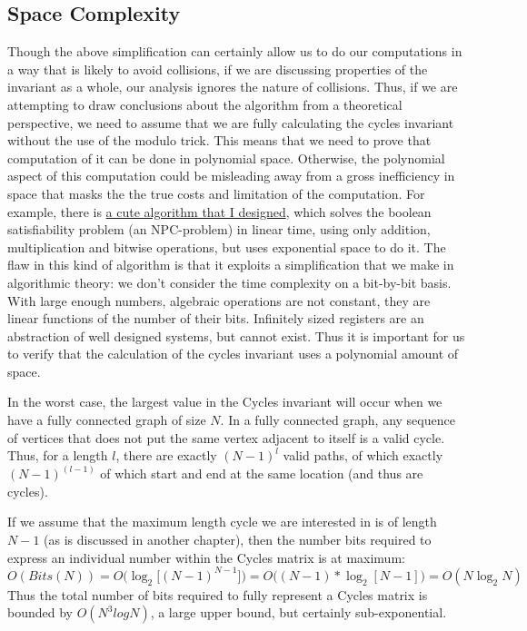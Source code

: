 \subsection{Space Complexity}
Though the above simplification can certainly allow us to do our computations in a way that is likely to avoid collisions, if we are discussing properties of the invariant as a whole, our analysis ignores the nature of collisions.
Thus, if we are attempting to draw conclusions about the algorithm from a theoretical perspective, we need to assume that we are fully calculating the cycles invariant without the use of the modulo trick.
This means that we need to prove that computation of it can be done in polynomial space.
Otherwise, the polynomial aspect of this computation could be misleading away from a gross inefficiency in space that masks the the true costs and limitation of the computation.
For example, there is \href{http://www.github.com/gbdubs/bytes}{a cute algorithm that I designed}, which solves the boolean satisfiability problem (an NPC-problem) in linear time, using only addition, multiplication and bitwise operations, but uses exponential space to do it. 
The flaw in this kind of algorithm is that it exploits a simplification that we make in algorithmic theory: we don't consider the time complexity on a bit-by-bit basis.
With large enough numbers, algebraic operations are not constant, they are linear functions of the number of their bits.
Infinitely sized registers are an abstraction of well designed systems, but cannot exist.
Thus it is important for us to verify that the calculation of the cycles invariant uses a polynomial amount of space.

In the worst case, the largest value in the Cycles invariant will occur when we have a fully connected graph of size $N$.
In a fully connected graph, any sequence of vertices that does not put the same vertex adjacent to itself is a valid cycle.
Thus, for a length $l$, there are exactly $(N-1)^l$ valid paths, of which exactly $(N-1)^{(l-1)}$ of which start and end at the same location (and thus are cycles).

If we assume that the maximum length cycle we are interested in is of length $N-1$ (as is discussed in another chapter), then the number bits required to express an individual number within the Cycles matrix is at maximum:
$$ O(Bits(N)) = O\Big( \log_2 \big[(N-1)^{N-1}\big] \Big) = O \big( (N - 1) * \log_2 [N-1] \big) = O(N \log_2 N)$$
Thus the total number of bits required to fully represent a Cycles matrix is bounded by $O(N^3logN)$, a large upper bound, but certainly sub-exponential.


